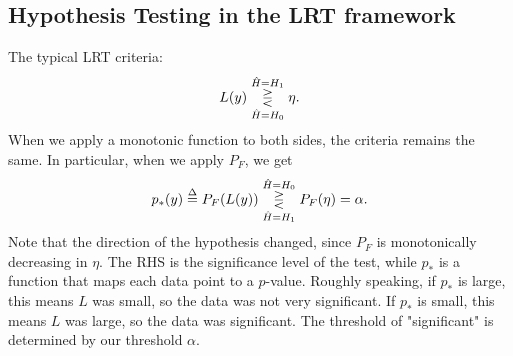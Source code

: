 \subsection{Hypothesis Testing in the LRT framework}

The typical LRT criteria:
\[L(y)\overunderset{\hat{H}=H_1}{\hat{H}=H_0}{\gtreqless} \eta.\] 
When we apply a monotonic function to both sides, the criteria remains the same. In particular, when we apply $P_F$, we get
\[p_*(y)\overset{\Delta}{=}P_F(L(y)) \overunderset{\hat{H}=H_0}{\hat{H}=H_1}{\gtreqless} P_F(\eta) = \alpha.\] 
Note that the direction of the hypothesis changed, since $P_F$ is monotonically decreasing in $\eta$. The RHS is the significance level of the test, while $p_*$ is a function that maps each data point to a $p$-value. Roughly speaking, if $p_*$ is large, this means $L$ was small, so the data was not very significant. If $p_*$ is small, this means $L$ was large, so the data was significant. The threshold of "significant" is determined by our threshold $\alpha$. 

